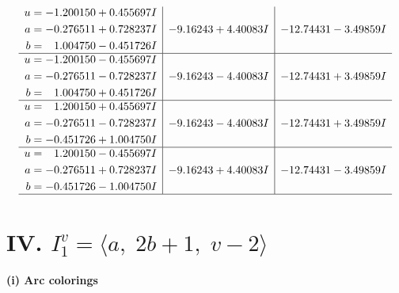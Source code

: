 \documentclass[1p]{elsarticle_modified}
\theoremstyle{definition}
\begin{document}
$$\begin{array}{c|c|c}
\begin{aligned}
u &= -1.200150 + 0.455697 I \\
a &= -0.276511 + 0.728237 I \\
b &= \phantom{-}1.004750 - 0.451726 I\end{aligned}
 & -9.16243 + 4.40083 I & -12.74431 - 3.49859 I \\ \hline\begin{aligned}
u &= -1.200150 - 0.455697 I \\
a &= -0.276511 - 0.728237 I \\
b &= \phantom{-}1.004750 + 0.451726 I\end{aligned}
 & -9.16243 - 4.40083 I & -12.74431 + 3.49859 I \\ \hline\begin{aligned}
u &= \phantom{-}1.200150 + 0.455697 I \\
a &= -0.276511 - 0.728237 I \\
b &= -0.451726 + 1.004750 I\end{aligned}
 & -9.16243 - 4.40083 I & -12.74431 + 3.49859 I \\ \hline\begin{aligned}
u &= \phantom{-}1.200150 - 0.455697 I \\
a &= -0.276511 + 0.728237 I \\
b &= -0.451726 - 1.004750 I\end{aligned}
 & -9.16243 + 4.40083 I & -12.74431 - 3.49859 I\\
 \hline 
 \end{array}$$\newpage\newpage\renewcommand{\arraystretch}{1}
\centering \section*{IV. $I^v_{1}= \langle a,\;2 b+1,\;v-2 \rangle$}
\flushleft \textbf{(i) Arc colorings}\\
\end{document}
